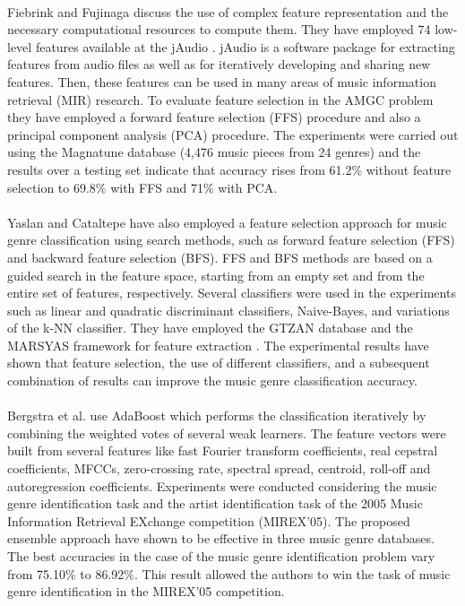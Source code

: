 \documentclass[10pt,twocolumn,letterpaper]{article}
\begin{document}
  \paragraph{}Fiebrink and Fujinaga \cite{to_fiebrink} discuss the use of complex feature representation and the necessary computational resources to compute them. They have employed 74 low-level features available at the jAudio \cite{to_jaudio}. jAudio is a software package for extracting features from audio files as well as for iteratively developing and sharing new features. Then, these features can be used in many areas of music information retrieval (MIR) research. To evaluate feature selection in the AMGC problem they have employed a forward feature selection (FFS) procedure and also a principal component analysis (PCA) procedure. The experiments were carried out using the Magnatune database (4,476 music pieces from 24 genres) \cite{magnatune} and the results over a testing set indicate that accuracy rises from 61.2\% without feature selection to 69.8\% with FFS and 71\% with PCA.

  \paragraph{}Yaslan and Cataltepe \cite{to_yaslan} have also employed a feature selection approach for music genre classification using search methods, such as forward feature selection (FFS) and backward feature selection (BFS). FFS and BFS methods are based on a guided search in the feature space, starting from an empty set and from the entire set of features, respectively. Several classifiers were used in the experiments such as linear and quadratic discriminant classifiers, Naive-Bayes, and variations of the k-NN classifier. They have employed the GTZAN database and the MARSYAS framework for feature extraction \cite{genre_classification_tp}. The experimental results have shown that feature selection, the use of different classifiers, and a subsequent combination of results can improve the music genre classification accuracy.

  \paragraph{}Bergstra et al. \cite{to_bergstra} use AdaBoost which performs the classification iteratively by combining the weighted votes of several weak learners. The feature vectors were built from several features like fast Fourier transform coefficients, real cepstral coefficients, MFCCs, zero-crossing rate, spectral spread, centroid, roll-off and autoregression coefficients. Experiments were conducted considering the music genre identification task and the artist identification task of the 2005 Music Information Retrieval EXchange competition (MIREX’05). The proposed ensemble approach have shown to be effective in three music genre databases. The best accuracies in the case of the music genre identification problem vary from 75.10\% to 86.92\%. This result allowed the authors to win the task of music genre identification in the MIREX’05 competition.
\end{document}
